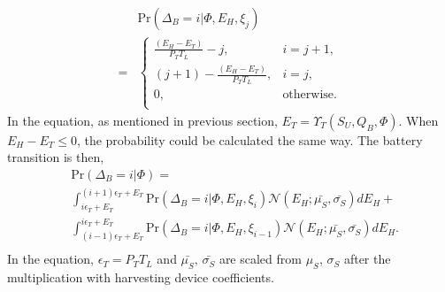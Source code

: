 \documentclass[conference]{IEEEtran}
\begin{document}
\begin{align}&\mbox{Pr}\left(\Delta_B = i |\Phi, E_H, \xi_j \right)\nonumber\\
=&\begin{cases} \frac{\left(E_H - E_T\right)}{P_TT_L} -j, &\mbox{$i = j + 1$},\\
\left(j+1\right) -\frac{\left(E_H - E_T\right)} {P_TT_L}, &\mbox{$i = j$},\\
0, &\mbox{otherwise.}\\
\end{cases}
\end{align}
In the equation, as mentioned in previous section, \(E_T = \Upsilon_T(S_U, Q_B, \Phi)\).
When \(E_H - E_T \le 0\), the probability could be calculated the same way.
The battery transition is then,
\begin{equation}\label{battery}
\begin{aligned}
	&\mbox{Pr}\left(\Delta_B = i |\Phi\right) = \\
	&\int\nolimits_{i\epsilon_T + E_T}^{\left(i+1\right)\epsilon_T+ E_T}
	\mbox{Pr}\left(\Delta_B = i |\Phi, E_H, \xi_i\right) \mathcal{N}\left(E_H;\bar{\mu_S},\bar{\sigma_S}\right) dE_H+\\
	& \int_{\left(i-1\right)\epsilon_T+ E_T}^{i\epsilon_T + E_T}
	\mbox{Pr}\left(\Delta_B = i |\Phi, E_H, \xi_{i-1}\right) \mathcal{N}\left(E_H;\bar{\mu_S},\bar{\sigma_S}\right) dE_H.\\
\end{aligned}
\end{equation}
In the equation, \(\epsilon_T = P_TT_L\) and \(\bar{\mu_S},\,\bar{\sigma_S}\)
are scaled from \(\mu_S,\,\sigma_S\) after the multiplication with harvesting device coefficients.
\end{document}
